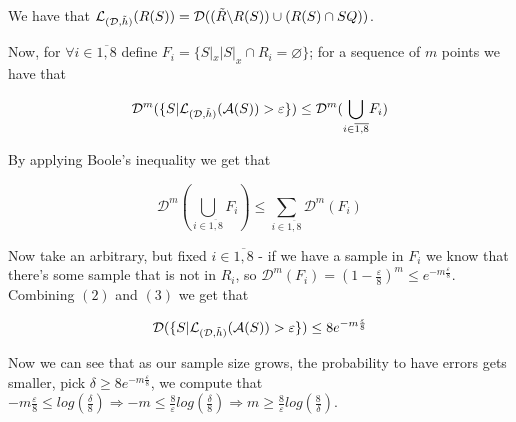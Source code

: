 \documentclass{article}
\newcommand{\<}{\langle}
\renewcommand{\>}{\rangle}
\renewcommand{\emptyset}{\varnothing}
\theoremstyle{definition}
\begin{document}
We have that $\mathcal{L}_{(\mathcal{D}, \Tilde{h})}(R(S))=\mathcal{D}((\Tilde{R} \backslash R(S)) \cup (R(S) \cap SQ))$.


Now, for $\forall i \in \overline{1,8}$ define $F_i=\{S|_x | S|_x \cap R_i = \emptyset \}$; for a sequence of $m$ points we have that 

\begin{equation}
    \mathcal{D}^m(\{ S | \mathcal{L}_{(\mathcal{D}, \Tilde{h})}(\mathcal{A}(S)) > \varepsilon \}) \leq \mathcal{D}^m(\underset{i \in \overline{1,8} }{\bigcup}F_i)
\end{equation}

By applying Boole's inequality we get that

\begin{equation}
    \mathcal{D}^m(\underset{i \in \overline{1,8} }{\bigcup}F_i) \leq \underset{i \in \overline{1,8}}{\sum}\mathcal{D}^m(F_i)
\end{equation}

Now take an arbitrary, but fixed $i \in \overline{1,8}$ - if we have a sample in $F_i$ we know that there's some sample that is not in $R_i$, so $\mathcal{D}^m(F_i) = (1 - \frac{\varepsilon}{8})^m \leq e^{-m\frac{\varepsilon}{8}}$. Combining $(2)$ and $(3)$ we get that

\begin{equation}
    \mathcal{D}(\{ S | \mathcal{L}_{(\mathcal{D}, \Tilde{h})}(\mathcal{A}(S)) > \varepsilon \}) \leq 
    8e^{-m\frac{\varepsilon}{8}}
\end{equation}

Now we can see that as our sample size grows, the probability to have errors gets smaller, pick $\delta \geq 8e^{-m\frac{\varepsilon}{8}}$, we compute that $-m\frac{\varepsilon}{8}\leq log(\frac{\delta}{8}) \Rightarrow -m \leq \frac{8}{\varepsilon}log(\frac{\delta}{8}) \Rightarrow m \geq \frac{8}{{\varepsilon}}log(\frac{8}{\delta})$.

\vspace{3mm}
\end{document}
